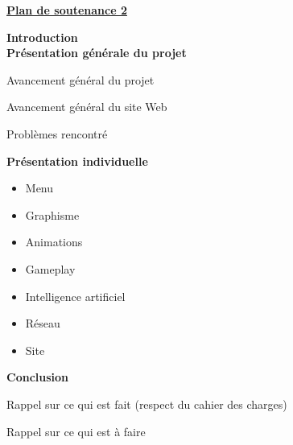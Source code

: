 \documentclass[a4paper, 12pt]{article}
\begin{document}
\begin{center}
\Huge{\bf{\underline{Plan de soutenance 2}}}
\end{center}
\Large{\bf{Introduction}}\\
\Large{\bf{Présentation générale du projet }}
\begin{itemize}
\begin{large}
\item Avancement général du projet
\item Avancement général du site Web
\item Problèmes rencontré
\end{large}
\end{itemize}
\Large{\bf{Présentation individuelle}}
\begin{large}
\begin{itemize}
\item Menu
\item Graphisme
\item Animations
\item Gameplay
\item Intelligence artificiel
\item Réseau
\item Site
\end{itemize}
\end{large}
\Large{\bf{Conclusion}}
\begin{itemize}
\begin{large}
\item Rappel sur ce qui est fait (respect du cahier des charges)
\item Rappel sur ce qui est à faire 
\end{large}
\end{itemize}
\end{document}
